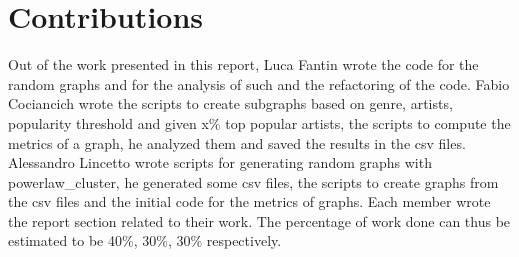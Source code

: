 \section{Contributions}

Out of the work presented in this report, Luca Fantin wrote the code for the random graphs 
and for the analysis of such and the refactoring of the code.
Fabio Cociancich wrote the scripts to create subgraphs based on genre, artists, 
popularity threshold and given  x\% top popular artists, the scripts to 
compute the metrics of a graph, he analyzed them and saved the results in the csv files.
Alessandro Lincetto wrote scripts for generating random graphs with powerlaw\_cluster,
he generated some csv files, the scripts to create graphs from the csv files and 
the initial code for the metrics of graphs.
Each member wrote the report section related to their work.
The percentage of work done can thus be estimated to be 40\%, 30\%, 30\% respectively.
